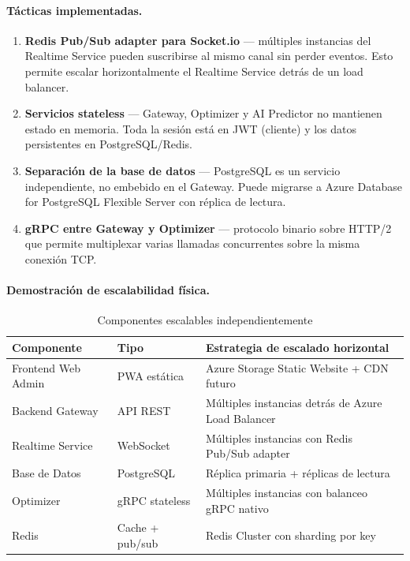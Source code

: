 \documentclass[12pt,a4paper,oneside]{article}
\begin{document}
\paragraph{T\'acticas implementadas.}

\begin{enumerate}[leftmargin=*]
  \item \textbf{Redis Pub/Sub adapter para Socket.io} --- m\'ultiples instancias del Realtime Service pueden suscribirse al mismo canal sin perder eventos. Esto permite escalar horizontalmente el Realtime Service detr\'as de un load balancer.
  \item \textbf{Servicios stateless} --- Gateway, Optimizer y AI Predictor no mantienen estado en memoria. Toda la sesi\'on est\'a en JWT (cliente) y los datos persistentes en PostgreSQL/Redis.
  \item \textbf{Separaci\'on de la base de datos} --- PostgreSQL es un servicio independiente, no embebido en el Gateway. Puede migrarse a Azure Database for PostgreSQL Flexible Server con r\'eplica de lectura.
  \item \textbf{gRPC entre Gateway y Optimizer} --- protocolo binario sobre HTTP/2 que permite multiplexar varias llamadas concurrentes sobre la misma conexi\'on TCP.
\end{enumerate}

\paragraph{Demostraci\'on de escalabilidad f\'isica.}

\begin{table}[H]
\centering
\caption{Componentes escalables independientemente}
\label{tab:escalabilidad-componentes}
\small
\begin{tabularx}{\textwidth}{l p{3cm} X}
\toprule
\textbf{Componente} & \textbf{Tipo} & \textbf{Estrategia de escalado horizontal} \\
\midrule
Frontend Web Admin & PWA est\'atica & Azure Storage Static Website + CDN futuro \\
Backend Gateway & API REST & M\'ultiples instancias detr\'as de Azure Load Balancer \\
Realtime Service & WebSocket & M\'ultiples instancias con Redis Pub/Sub adapter \\
Base de Datos & PostgreSQL & R\'eplica primaria + r\'eplicas de lectura \\
Optimizer & gRPC stateless & M\'ultiples instancias con balanceo gRPC nativo \\
Redis & Cache + pub/sub & Redis Cluster con sharding por key \\
\bottomrule
\end{tabularx}
\end{table}
\end{document}
